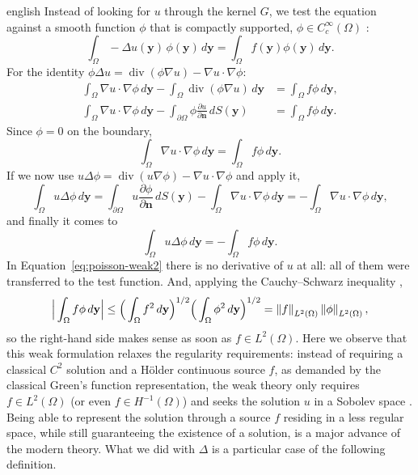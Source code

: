 \documentclass[0000.tex]{subfiles}
\begin{document}
\begin{hyphenrules}{english}
Instead of looking for $u$ through the kernel $G$, we test the equation against a smooth function
$\phi$ that is compactly supported, $\phi\in C_c^\infty(\Omega)$ \cite{reyna_sobolev}:
\begin{equation}
  \int_\Omega-\Delta u(\mathbf{y})\,\phi(\mathbf{y})\,d\mathbf{y}=\int_\Omega f(\mathbf{y})\phi(\mathbf{y})\,d\mathbf{y}.
  \label{eq:poisson-tested}
\end{equation}
For the identity $\phi\Delta u=\operatorname{div}(\phi\nabla u)-\nabla u\cdot\nabla\phi$:
\begin{align*}
  \int_\Omega\nabla u\cdot\nabla\phi\,d\mathbf{y}-\int_\Omega\operatorname{div}(\phi\nabla u)\,d\mathbf{y}
    &=\int_\Omega f\phi\,d\mathbf{y},\\
  \int_\Omega\nabla u\cdot\nabla\phi\,d\mathbf{y}-\int_{\partial\Omega}\phi\frac{\partial u}{\partial\mathbf{n}}\,d S(\mathbf{y})
    &=\int_\Omega f\phi\,d\mathbf{y}.
\end{align*}
Since $\phi=0$ on the boundary,
\begin{equation}
  \int_\Omega\nabla u\cdot\nabla\phi\,d\mathbf{y}=\int_\Omega f\phi\,d\mathbf{y}.
  \label{eq:poisson-weak1}
\end{equation}
If we now use $u\Delta\phi=\operatorname{div}(u\nabla\phi)-\nabla u\cdot\nabla\phi$ and apply it,
\[
  \int_\Omega u\Delta\phi\,d\mathbf{y}=\int_{\partial\Omega}u\frac{\partial\phi}{\partial\mathbf{n}}\,d S(\mathbf{y})
  -\int_\Omega\nabla u\cdot\nabla\phi\,d\mathbf{y}=-\int_\Omega\nabla u\cdot\nabla\phi\,d\mathbf{y},
\]
and finally it comes to
\begin{equation}
  \int_\Omega u\Delta\phi\,d\mathbf{y}=-\int_\Omega f\phi\,d\mathbf{y}.
  \label{eq:poisson-weak2}
\end{equation}
In Equation~\eqref{eq:poisson-weak2} there is no derivative of $u$ at all: all of them were transferred to the
test function. And, applying the Cauchy--Schwarz inequality \cite{castillo2014},
\begin{equation}
  \Big|\int_\Omega f\phi\,d\mathbf{y}\Big|\le\Big(\int_\Omega f^2\,d\mathbf{y}\Big)^{1/2}\Big(\int_\Omega\phi^2\,d\mathbf{y}\Big)^{1/2}
  =\left\lVert f \right\rVert_{L^2(\Omega)}\left\lVert \phi \right\rVert_{L^2(\Omega)},
  \label{eq:cauchy-schwarz}
\end{equation}
so the right-hand side makes sense as soon as $f\in L^2(\Omega)$. Here we observe that this weak
formulation relaxes the regularity requirements: instead of requiring a classical $C^2$ solution and a
Hölder continuous source $f$, as demanded by the classical Green's function representation, the weak
theory only requires $f\in L^2(\Omega)$ (or even $f\in H^{-1}(\Omega)$) and seeks the solution $u$ in a
Sobolev space \cite{castillo2014}. Being able to represent the solution through a source $f$
residing in a less regular space, while still guaranteeing the existence of a solution, is a major
advance of the modern theory. What we did with $\Delta$ is a particular case of the following
definition.


\end{hyphenrules}
\end{document}
